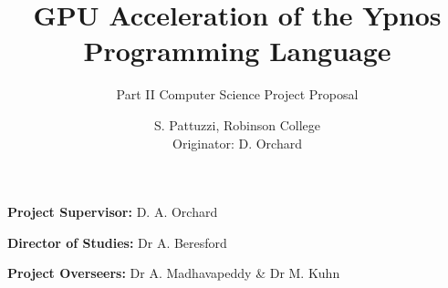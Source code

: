 \documentclass[12pt,a4,parskip=full]{scrartcl}
\begin{document}
\subtitle{Part II Computer Science Project Proposal}
\title{GPU Acceleration of the Ypnos Programming Language}
\author{
S. Pattuzzi, Robinson College\\
Originator: D. Orchard
}

\maketitle

\noindent
\textbf{Project Supervisor:} D. A. Orchard
\vspace{0.2in}

\noindent
\textbf{Director of Studies:} Dr A. Beresford
\vspace{0.2in}
\noindent
 
\noindent
\textbf{Project Overseers:} Dr A. Madhavapeddy \& Dr M. Kuhn


\end{document}
